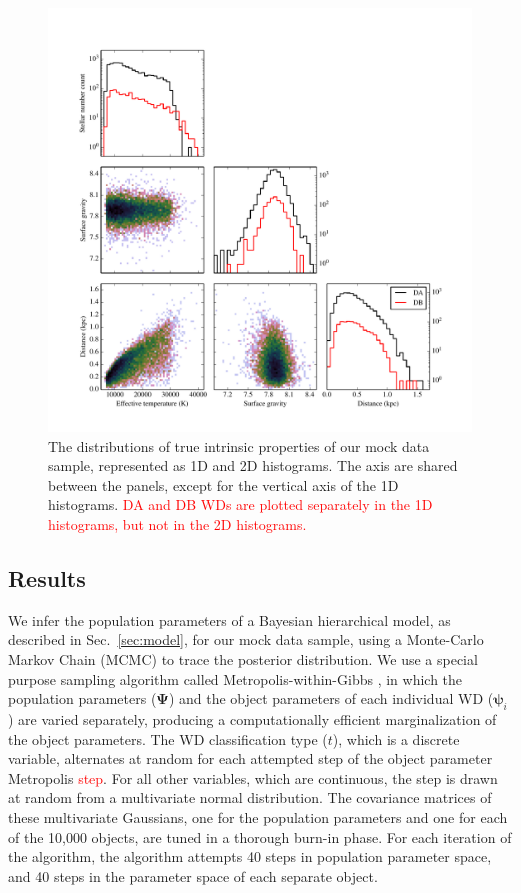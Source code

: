 \documentclass[fleqn,usenatbib]{mnras}
\newcommand{\changes}[1]{\textcolor{red}{#1}}
\newcommand{\popp}{\boldsymbol{\Psi}}
\newcommand{\objp}{\boldsymbol{\psi}}
\begin{document}
\begin{figure}
	\includegraphics[width=.9\textwidth]{10000WDs.pdf}
    \caption{The distributions of true intrinsic properties of our mock data sample, represented as 1D and 2D histograms. The axis are shared between the panels, except for the vertical axis of the 1D histograms. \changes{DA and DB WDs are plotted separately in the 1D histograms, but not in the 2D histograms.}}
    \label{fig:10000WDs}
\end{figure}



\subsection{Results}

We infer the population parameters of a Bayesian hierarchical model, as described in Sec.~\ref{sec:model}, for our mock data sample, using a Monte-Carlo Markov Chain (MCMC) to trace the posterior distribution. We use a special purpose sampling algorithm called Metropolis-within-Gibbs \citep{BayesianDataAnalysis}, in which the population parameters ($\popp$) and the object parameters of each individual WD ($\objp_i$) are varied separately, producing a computationally efficient marginalization of the object parameters. The WD classification type ($t$), which is a discrete variable, alternates at random for each attempted step of the object parameter Metropolis \changes{step}. For all other variables, which are continuous, the step is drawn at random from a multivariate normal distribution. The covariance matrices of these multivariate Gaussians, one for the population parameters and one for each of the 10,000 objects, are tuned in a thorough burn-in phase. For each iteration of the algorithm, the algorithm attempts 40 steps in population parameter space, and 40 steps in the parameter space of each separate object.
\end{document}
